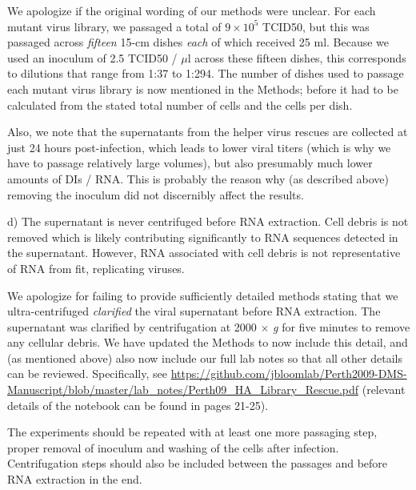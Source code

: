 \documentclass[11pt, oneside]{article}   	%
\newcommand{\response}[1]{{\color{black}#1}}
\begin{document}
\response{
We apologize if the original wording of our methods were unclear. 
For each mutant virus library, we passaged a total of $9\times10^5$ TCID50, but this was passaged across \emph{fifteen} 15-cm dishes \emph{each} of which received 25 ml.
Because we used an inoculum of 2.5 TCID50 / $\mu$l across these fifteen dishes, this corresponds to dilutions that range from 1:37 to 1:294.
The number of dishes used to passage each mutant virus library is now mentioned in the Methods; before it had to be calculated from the stated total number of cells and the cells per dish.

Also, we note that the supernatants from the helper virus rescues are collected at just 24 hours post-infection, which leads to lower viral titers (which is why we have to passage relatively large volumes), but also presumably much lower amounts of DIs / RNA.
This is probably the reason why (as described above) removing the inoculum did not discernibly affect the results.
}

d) The supernatant is never centrifuged before RNA extraction. Cell debris is not removed which is likely contributing significantly to RNA sequences detected in the supernatant. However, RNA associated with cell debris is not representative of RNA from fit, replicating viruses. 

\response{We apologize for failing to provide sufficiently detailed methods stating that we ultra-centrifuged \emph{clarified} the viral supernatant before RNA extraction.
The supernatant was clarified by centrifugation at 2000 $\times$ \textit{g} for five minutes to remove any cellular debris.
We have updated the Methods to now include this detail, and (as mentioned above) also now include our full lab notes so that all other details can be reviewed.
Specifically, see \url{https://github.com/jbloomlab/Perth2009-DMS-Manuscript/blob/master/lab_notes/Perth09_HA_Library_Rescue.pdf} (relevant details of the notebook can be found in pages 21-25).
}

The experiments should be repeated with at least one more passaging step, proper removal of inoculum and washing of the cells after infection. Centrifugation steps should also be included between the passages and before RNA extraction in the end. 
\end{document}
